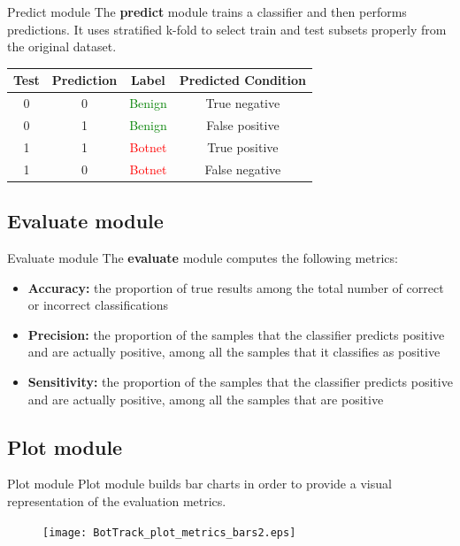 \documentclass{beamer}
\begin{document}
	\begin{frame}{Predict module}
		The \textbf{predict} module trains a classifier and then performs predictions. It uses stratified k-fold to select train and test subsets properly from the original dataset.
		\begin{longtable}[h]{c c c c}
			\hline
			\textbf{Test} & \textbf{Prediction} & \textbf{Label} & \textbf{Predicted Condition } \\ \hline \hline
			0 & 0 & \textcolor{green}{Benign} & True negative \\ \hline
			0 & 1 & \textcolor{green}{Benign} & False positive \\ \hline
			1 & 1 & \textcolor{red}{Botnet} & True positive \\ \hline
			1 & 0 & \textcolor{red}{Botnet} & False negative \\ \hline
		\end{longtable}
	\end{frame}
	
	\subsection{Evaluate module}
	
	\begin{frame}{Evaluate module}
		The \textbf{evaluate} module computes the following metrics:
		
		\begin{itemize}
			\item \textbf{Accuracy:} the proportion of true results among the total number of correct or incorrect classifications
			\item \textbf{Precision:} the proportion of the samples that the classifier predicts positive and are actually positive, among all the samples that it classifies as positive
			\item \textbf{Sensitivity:} the proportion of the samples that the classifier predicts positive and are actually positive, among all the samples that are positive
		\end{itemize}

	\end{frame}
	
	\subsection{Plot module}
	
	\begin{frame}{Plot module}
		Plot module builds bar charts in order to provide a visual representation of the evaluation metrics.
	
		\begin{figure}
			\texttt{[image: BotTrack\_plot\_metrics\_bars2.eps]}
		\end{figure}
	\end{frame}
	
\end{document}
